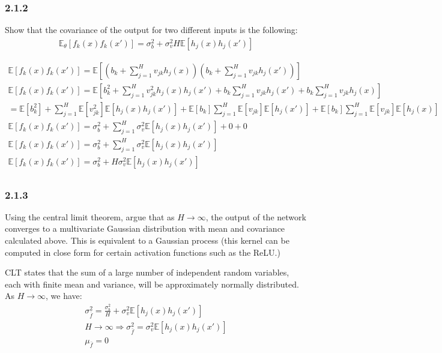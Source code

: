 \documentclass[12pt]{article}
\begin{document}
\subsubsection{2.1.2}
Show that the covariance of the output for two different inputs is the following:
\begin{gather*}
    \mathbb{E}_\theta[f_k(x)f_k(x')] = \sigma_b^2 + \sigma_v^2 H \mathbb{E}[h_j(x)h_j(x')]
\end{gather*}
\begin{qsolve}
    \begin{gather*}
        \mathbb{E}[f_k(x)f_k(x')] = \mathbb{E}[(b_k + \sum_{j=1}^{H} v_{jk} h_j(x))(b_k + \sum_{j=1}^{H} v_{jk} h_j(x'))] \\
        \mathbb{E}[f_k(x)f_k(x')] = \mathbb{E}[b_k^2 + \sum_{j=1}^{H} v_{jk}^2 h_j(x) h_j(x') + b_k \sum_{j=1}^{H} v_{jk} h_j(x') + b_k \sum_{j=1}^{H} v_{jk} h_j(x)] \\
        = \mathbb{E}[b_k^2] + \sum_{j=1}^{H} \mathbb{E}[v_{jk}^2] \mathbb{E}[h_j(x) h_j(x')] + \mathbb{E}[b_k] \sum_{j=1}^{H} \mathbb{E}[v_{jk}] \mathbb{E}[h_j(x')] + \mathbb{E}[b_k] \sum_{j=1}^{H} \mathbb{E}[v_{jk}] \mathbb{E}[h_j(x)] \\
        \mathbb{E}[f_k(x)f_k(x')] = \sigma_b^2 + \sum_{j=1}^{H} \sigma_v^2 \mathbb{E}[h_j(x) h_j(x')] + 0 + 0 \\
        \mathbb{E}[f_k(x)f_k(x')] = \sigma_b^2 + \sum_{j=1}^{H} \sigma_v^2 \mathbb{E}[h_j(x) h_j(x')] \\
        \mathbb{E}[f_k(x)f_k(x')] = \sigma_b^2 + H \sigma_v^2 \mathbb{E}[h_j(x) h_j(x')] \\
    \end{gather*}
\end{qsolve}
\subsubsection{2.1.3}
Using the central limit theorem, argue that as $H \rightarrow \infty$, the output of the network converges
to a multivariate Gaussian distribution with mean and covariance calculated above. This is
equivalent to a Gaussian process (this kernel can be computed in close form for certain activation
functions such as the ReLU.)
\begin{qsolve}
    CLT states that the sum of a large number of independent random variables, each with finite mean and variance, will be approximately normally distributed. \\
    As $H \rightarrow \infty$, we have:
    \begin{gather*}
        \sigma_{\bar{f}}^2 = \frac{\sigma_b^2}{H} + \sigma_v^2 \mathbb{E}[h_j(x) h_j(x')] \\
        H \rightarrow \infty \Rightarrow \sigma_{\bar{f}}^2 = \sigma_v^2 \mathbb{E}[h_j(x) h_j(x')] \\
        \mu_{\bar{f}} = 0 \\
    \end{gather*}
\end{qsolve}
\end{document}
